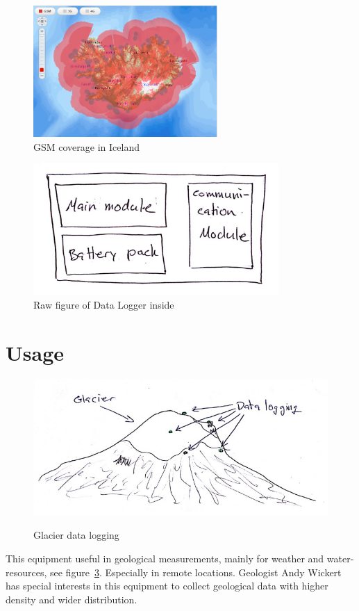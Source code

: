 \documentclass[12pt,a4paper,titlepage]{article}
\begin{document}
\begin{figure}
\centering
\includegraphics[height=50mm]{graphics/GSM_Coverage.PNG}
\caption{GSM coverage in Iceland\label{fig:GSM-Coverage} \cite{vodafone}}
\end{figure}

\begin{figure}
\centering
\includegraphics[height=50mm]{graphics/Inside_box.PNG}
\caption{Raw figure of Data Logger inside\label{fig:Inside} \cite{InsideBox}}
\end{figure}

\section{Usage} 

\begin{figure}
\centering
\includegraphics[width=0.7\linewidth]{graphics/Logging}
\caption{Glacier data logging}
\label{fig:glacier}\cite{Helgason_glacier}
\end{figure}

 This equipment useful in geological measurements, mainly for weather and water-resources, see figure~\ref*{fig:glacier}. Especially in remote locations. 
 Geologist Andy Wickert has special interests in this equipment to collect geological data with higher density and wider distribution. 
 
\end{document}
